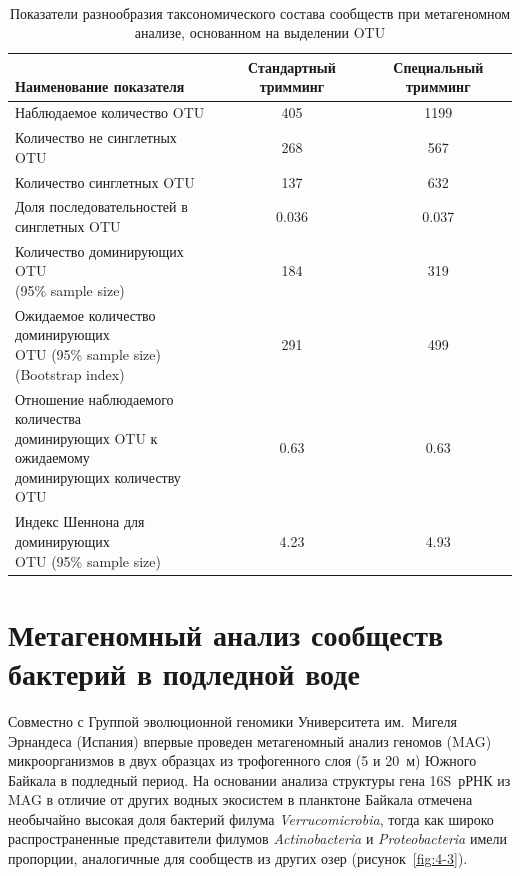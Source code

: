 \documentclass[a4paper,12pt,openany,final]{extreport}
\def\oldcaption{} \let\oldcaption=\caption
\def\caption{\stepcounter{captionsnum}\oldcaption}
\newcommand\T{\rule{0pt}{2.6ex}}       %
\begin{document}
\begin{table}[h!]
  \centering
  \caption{Показатели разнообразия таксономического состава сообществ при метагеномном анализе, основанном на выделении OTU}\label{table:3-1}

{\tt
\begin{tabular}[]{|>{\rm\raggedright}p{}|c|c|}
  \hline
\makecell[cc]{\rm\bfseries\\[-0.3em]\bf{}Наименование показателя} & \multicolumn{1}{p{3cm}|}{\rm\centering\bfseries Стандартный тримминг} &
\multicolumn{1}{p{3cm}|}{\rmfamily\centering\bfseries{}Специальный тримминг}\tabularnewline\hline
\T Наблюдаемое количество OTU & 405 & 1199\tabularnewline\hline
Количество не синглетных OTU & 268 & 567\tabularnewline\hline
Количество синглетных OTU & 137 & 632\tabularnewline\hline
\makecell[cl]{Доля последовательностей в\\ синглетных OTU} &\multirow{1}{*}{0.036} &\multirow{1}{*}{0.037}\tabularnewline\hline
\makecell[cl]{Количество доминирующих OTU\\
(95\% sample size)} &\multirow{1}{*}{184}&\multirow{1}{*}{319}
\tabularnewline\hline
\makecell[cl]{Ожидаемое количество доминирующих\\ OTU (95\% sample size)\\ (Bootstrap index)}&\multirow{1}{*}{291}&\multirow{1}{*}{499}\\\hline
\makecell[cl]{Отношение наблюдаемого количества\\ доминирующих OTU к ожидаемому\\
доминирующих количеству OTU} &\multirow{1}{*}{0.63} &\multirow{1}{*}{0.63}\tabularnewline\hline
\makecell[cl]{Индекс Шеннона для доминирующих\\ OTU
(95\% sample size)}&\multirow{1}{*}{4.23}&\multirow{1}{*}{4.93}\\
\hline
\end{tabular}}
\end{table}


\chapter{Метагеномный анализ сообществ бактерий в подледной воде} \label{chap:3}

Совместно с Группой эволюционной геномики Университета им.~Мигеля Эрнандеса (Испания) впервые проведен метагеномный анализ геномов (MAG) микроорганизмов в двух образцах из трофогенного слоя (5 и 20~м) Южного Байкала в подледный период. На основании анализа структуры гена 16S~рРНК из MAG в отличие от других водных экосистем в планктоне Байкала отмечена необычайно высокая доля бактерий филума \emph{Verrucomicrobia}, тогда как широко распространенные представители филумов \emph{Actinobacteria} и \emph{Proteobacteria} имели пропорции, аналогичные для сообществ из других озер (рисунок~\ref{fig:4-3}).
\end{document}
